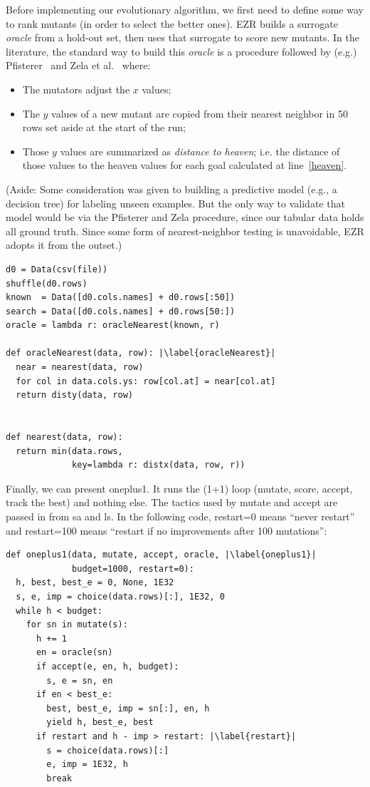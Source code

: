 \documentclass[AMA,STIX2COL]{WileyNJDv5}
\begin{document}
Before implementing our evolutionary algorithm, we first need to
define some way to rank mutants (in order to select the better
ones). EZR builds a surrogate {\em oracle} from a hold-out set,
then uses that surrogate to score new mutants. In the literature,
the standard way to build this {\em oracle} is a procedure followed
by (e.g.) Pfisterer~\cite{pfisterer2022yahpo} and Zela et
al.~\cite{zela2020surrogate} where:
\begin{itemize}
\item The mutators adjust the $x$ values;
\item The $y$ values of a new mutant are copied from their nearest
neighbor in 50 rows set aside at the start of the run;
\item Those $y$ values are summarized as {\em distance to heaven};
i.e. the distance of those values to the \textsf{heaven} values
for each goal calculated at line~\ref{heaven}.
\end{itemize}
		(Aside: Some
consideration was given to building a predictive model (e.g., a
decision tree) for labeling   unseen examples. But the
only way to validate that  model would be via the Pfisterer
and Zela procedure, since our tabular data holds all   ground
truth. Since some form of nearest-neighbor testing is unavoidable,
		EZR adopts it from the outset.)
\begin{verbatim}
d0 = Data(csv(file))   
shuffle(d0.rows)
known  = Data([d0.cols.names] + d0.rows[:50])
search = Data([d0.cols.names] + d0.rows[50:])
oracle = lambda r: oracleNearest(known, r)

def oracleNearest(data, row): |\label{oracleNearest}|
  near = nearest(data, row)
  for col in data.cols.ys: row[col.at] = near[col.at]
  return disty(data, row)
  

def nearest(data, row): 
  return min(data.rows, 
             key=lambda r: distx(data, row, r))
\end{verbatim}
Finally, we can present \textsf{oneplus1}.   It runs the (1+1) loop
(mutate, score, accept, track the best) and nothing else. The
tactics used by \textsf{mutate} and \textsf{accept} are passed in
from \textsf{sa} and \textsf{ls}.
In the following code,
\textsf{restart=0} means ``never restart'' and \textsf{restart=100}
means ``restart if no improvements after 100 mutations'':
\begin{verbatim}
def oneplus1(data, mutate, accept, oracle, |\label{oneplus1}|
             budget=1000, restart=0): 
  h, best, best_e = 0, None, 1E32
  s, e, imp = choice(data.rows)[:], 1E32, 0
  while h < budget:
    for sn in mutate(s):
      h += 1
      en = oracle(sn)
      if accept(e, en, h, budget):
        s, e = sn, en
      if en < best_e:
        best, best_e, imp = sn[:], en, h
        yield h, best_e, best
      if restart and h - imp > restart: |\label{restart}|
        s = choice(data.rows)[:]
        e, imp = 1E32, h
        break
\end{verbatim}
\end{document}
